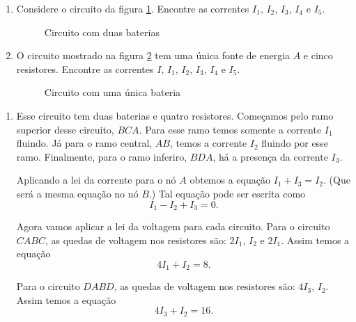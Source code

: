 \begin{exemplos}
    \begin{enumerate}
        \item Considere o circuito da figura \ref{circuitoduasbaterias}. Encontre as correntes $I_1$, $I_2$, $I_3$, $I_4$ e $I_5$.

        \begin{figure}[!h]
            \centering
            
            \caption{Circuito com duas baterias}
            \label{circuitoduasbaterias}
        \end{figure}

        \item O circuito mostrado na figura \ref{circuitocomumaunicafonte} tem uma única fonte de energia $A$ e cinco resistores. Encontre as correntes $I$, $I_1$, $I_2$, $I_3$, $I_4$ e $I_5$.

        \begin{figure}[!h]
            \centering
            
            \caption{Circuito com uma única bateria}
            \label{circuitocomumaunicafonte}
        \end{figure}
    \end{enumerate}
    \begin{solucao}
        \begin{enumerate}
            \item Esse circuito tem duas baterias e quatro resistores. Começamos pelo ramo superior desse circuito, $BCA$. Para esse ramo temos somente a corrente $I_1$ fluindo.  Já para o ramo central, $AB$, temos a corrente $I_2$ fluindo por esse ramo. Finalmente, para o ramo inferiro, $BDA$, há a presença da corrente $I_3$.

            Aplicando a lei da corrente para o nó $A$ obtemos a equação $I_1 + I_3 = I_2$. (Que será a mesma equação no nó $B$.) Tal equação pode ser escrita como
            \[
                I_1 - I_2 + I_3 = 0.
            \]

            Agora vamos aplicar a lei da voltagem para cada circuito. Para o circuito $CABC$, as quedas de voltagem nos resistores são: $2I_1$, $I_2$ e $2I_1$. Assim temos a equação
            \begin{equation}\label{equacaocircuitoCABC}
                4I_1 + I_2 = 8.
            \end{equation}

            Para o circuito $DABD$, as quedas de voltagem nos resistores são: $4I_3$, $I_2$. Assim temos a equação
            \begin{equation}\label{equacaocircuitoDABD}
                4I_3 + I_2 = 16.
            \end{equation}


\end{enumerate}
\end{solucao}
\end{exemplos}
